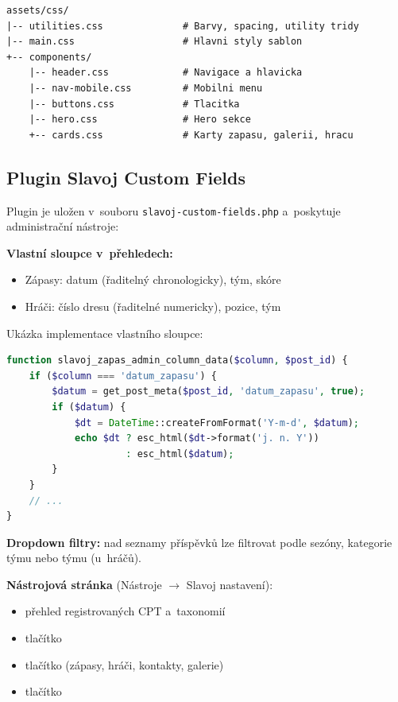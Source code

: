 \documentclass[12pt,a4paper]{article}
\begin{document}
\begin{lstlisting}
assets/css/
|-- utilities.css              # Barvy, spacing, utility tridy
|-- main.css                   # Hlavni styly sablon
+-- components/
    |-- header.css             # Navigace a hlavicka
    |-- nav-mobile.css         # Mobilni menu
    |-- buttons.css            # Tlacitka
    |-- hero.css               # Hero sekce
    +-- cards.css              # Karty zapasu, galerii, hracu
\end{lstlisting}

\subsection{Plugin Slavoj Custom Fields}

Plugin je uložen v~souboru \texttt{slavoj-custom-fields.php} a~poskytuje administrační nástroje:

\textbf{Vlastní sloupce v~přehledech:}
\begin{itemize}
    \item Zápasy: datum (řaditelný chronologicky), tým, skóre
    \item Hráči: číslo dresu (řaditelné numericky), pozice, tým
\end{itemize}

Ukázka implementace vlastního sloupce:

\begin{lstlisting}[language=PHP]
function slavoj_zapas_admin_column_data($column, $post_id) {
    if ($column === 'datum_zapasu') {
        $datum = get_post_meta($post_id, 'datum_zapasu', true);
        if ($datum) {
            $dt = DateTime::createFromFormat('Y-m-d', $datum);
            echo $dt ? esc_html($dt->format('j. n. Y'))
                     : esc_html($datum);
        }
    }
    // ...
}
\end{lstlisting}

\textbf{Dropdown filtry:} nad seznamy příspěvků lze filtrovat podle sezóny, kategorie týmu nebo týmu (u~hráčů).

\textbf{Nástrojová stránka} (Nástroje $\rightarrow$ Slavoj nastavení):
\begin{itemize}
    \item přehled registrovaných CPT a~taxonomií
    \item tlačítko 
    \item tlačítko  (zápasy, hráči, kontakty, galerie)
    \item tlačítko 
\end{itemize}
\end{document}
